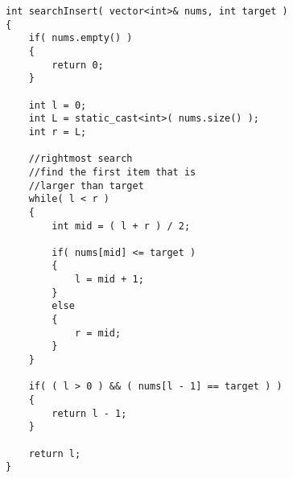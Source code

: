 \setcounter{lstlisting}{0}
\begin{lstlisting}[style=customc, caption={Rightmost Binary Search}]
int searchInsert( vector<int>& nums, int target )
{
    if( nums.empty() )
    {
        return 0;
    }

    int l = 0;
    int L = static_cast<int>( nums.size() );
    int r = L;

    //rightmost search
    //find the first item that is
    //larger than target
    while( l < r )
    {
        int mid = ( l + r ) / 2;

        if( nums[mid] <= target )
        {
            l = mid + 1;
        }
        else
        {
            r = mid;
        }
    }

    if( ( l > 0 ) && ( nums[l - 1] == target ) )
    {
        return l - 1;
    }

    return l;
}

\end{lstlisting}